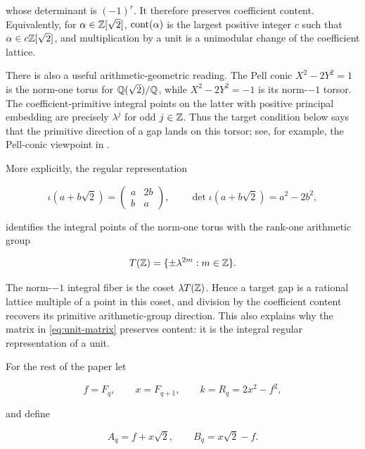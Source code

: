 whose determinant is $(-1)^r$. It therefore preserves coefficient content.
Equivalently, for $\alpha\in\mathbb{Z}[\sqrt2]$, $\operatorname{cont}\!\left(\alpha\right)$ is the largest
positive integer $c$ such that $\alpha\in c\mathbb{Z}[\sqrt2]$, and multiplication
by a unit is a unimodular change of the coefficient lattice.

There is also a useful arithmetic-geometric reading. The Pell conic
$X^2-2Y^2=1$ is the norm-one torus for $\mathbb{Q}(\sqrt2)/\mathbb{Q}$, while
$X^2-2Y^2=-1$ is its norm-$-1$ torsor. The coefficient-primitive integral
points on the latter with positive principal embedding are precisely
$\lambda^j$ for odd $j\in\mathbb{Z}$.
Thus the target condition below says that the primitive direction of a gap
lands on this torsor; see, for example, the Pell-conic viewpoint in
\cite[Chapter~7]{Lemmermeyer2021}.

More explicitly, the regular representation

\begin{equation}
 \iota(a+b\sqrt2)=
 \begin{pmatrix}a&2b\\ b&a\end{pmatrix},
 \qquad
 \det\iota(a+b\sqrt2)=a^2-2b^2,
 \label{eq:regular-representation}
\end{equation}

identifies the integral points of the norm-one torus with the rank-one
arithmetic group

\begin{equation}
 T(\mathbb{Z})=\{\pm\lambda^{2m}:m\in\mathbb{Z}\}.
 \label{eq:norm-one-arithmetic-group}
\end{equation}

The norm-$-1$ integral fiber is the coset $\lambda T(\mathbb{Z})$. Hence a target
gap is a rational lattice multiple of a point in this coset, and division by
the coefficient content recovers its primitive arithmetic-group direction.
This also explains why the matrix in \cref{eq:unit-matrix} preserves content:
it is the integral regular representation of a unit.

For the rest of the paper let

\begin{equation}
 f=F_q,
 \qquad
 x=F_{q+1},
 \qquad
 k=R_q=2x^2-f^2,
 \label{eq:f-x-k}
\end{equation}

and define

\begin{equation}
 A_q=f+x\sqrt2,
 \qquad
 B_q=x\sqrt2-f.
 \label{eq:A-B}
\end{equation}

